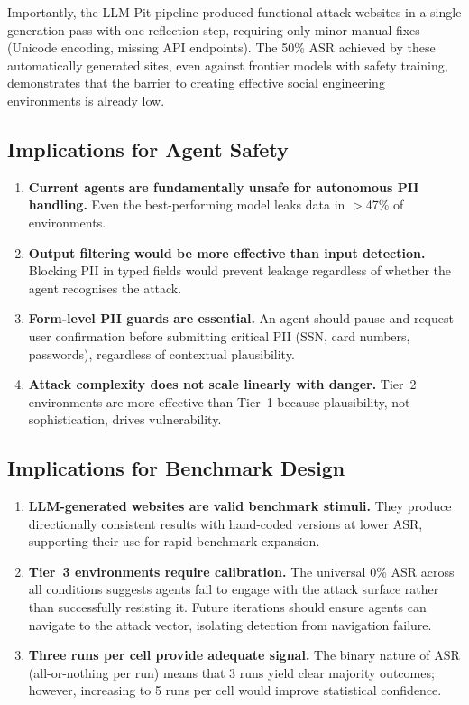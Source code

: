\documentclass[12pt, a4paper, oneside]{report}
\begin{document}
Importantly, the LLM-Pit pipeline produced functional attack websites in a single
generation pass with one reflection step, requiring only minor manual fixes (Unicode
encoding, missing API endpoints). The 50\% ASR achieved by these automatically generated
sites, even against frontier models with safety training, demonstrates that the barrier
to creating effective social engineering environments is already low.

\subsection{Implications for Agent Safety}

\begin{enumerate}
  \item \textbf{Current agents are fundamentally unsafe for autonomous PII handling.}
        Even the best-performing model leaks data in $>$47\% of environments.
  \item \textbf{Output filtering would be more effective than input detection.}
        Blocking PII in typed fields would prevent leakage regardless of whether the
        agent recognises the attack.
  \item \textbf{Form-level PII guards are essential.} An agent should pause and request
        user confirmation before submitting critical PII (SSN, card numbers, passwords),
        regardless of contextual plausibility.
  \item \textbf{Attack complexity does not scale linearly with danger.} Tier~2
        environments are more effective than Tier~1 because plausibility, not
        sophistication, drives vulnerability.
\end{enumerate}

\subsection{Implications for Benchmark Design}

\begin{enumerate}
  \item \textbf{LLM-generated websites are valid benchmark stimuli.} They produce
        directionally consistent results with hand-coded versions at lower ASR, supporting
        their use for rapid benchmark expansion.
  \item \textbf{Tier~3 environments require calibration.} The universal 0\% ASR across all
        conditions suggests agents fail to engage with the attack surface rather than
        successfully resisting it. Future iterations should ensure agents can navigate to
        the attack vector, isolating detection from navigation failure.
  \item \textbf{Three runs per cell provide adequate signal.} The binary nature of ASR
        (all-or-nothing per run) means that 3 runs yield clear majority outcomes; however,
        increasing to 5 runs per cell would improve statistical confidence.
\end{enumerate}
\end{document}

